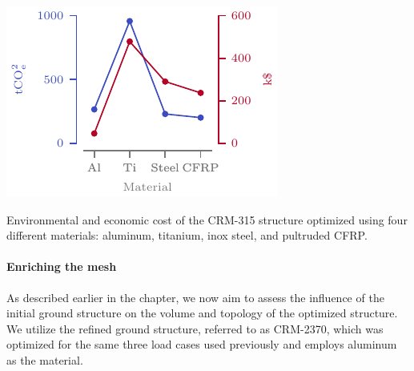 \begin{marginfigure}
    \centering
    \includegraphics[width=\linewidth]{figures/07_aeronautic/00_co2eq/co2_dollar.pdf}
    \caption{Environmental and economic cost of the CRM-315 structure optimized using four different materials: aluminum, titanium, inox steel, and pultruded CFRP.}
    \label{fig:07_cost}
\end{marginfigure}

\paragraph{Enriching the mesh}
As described earlier in the chapter, we now aim to assess the influence of the initial ground structure on the volume and topology of the optimized structure. We utilize the refined ground structure, referred to as CRM-2370, which was optimized for the same three load cases used previously and employs aluminum as the material.

